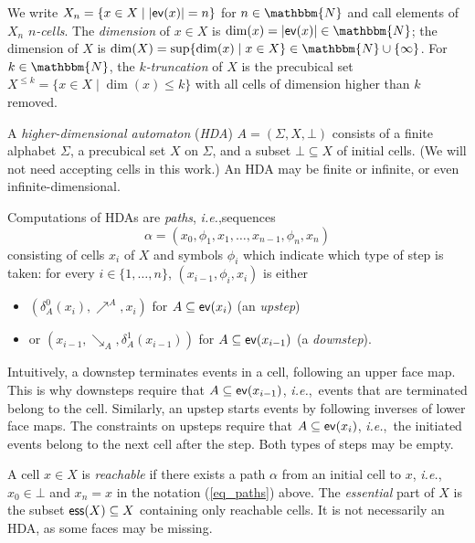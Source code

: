 \documentclass[runningheads,envcountsame]{llncs}
\newcommand*\ie{\textit{i.e.},}
\newcommand*\ev{\textup{\textsf{ev}}}
\newcommand*\Nat{\mathbbm{N}}
\newcommand*\arrO[1]{\mathrel{\nearrow^{#1}}}
\newcommand*\arrI[1]{\mathrel{\searrow_{#1}}}
\newcommand*\ess{\textup{\textsf{ess}}}
\begin{document}
We write $X_n=\{x\in X\mid |\ev(x)|=n\}$ for $n\in \Nat$ and call elements of $X_n$ \emph{$n$-cells}.
The \emph{dimension} of $x\in X$ is $\dim(x)=|\ev(x)|\in \Nat$;
the dimension of $X$ is $\dim(X)=\sup\{\dim(x)\mid x\in X\}\in \Nat\cup\{\infty\}$.
For $k\in \Nat$, the \emph{$k$-truncation} of $X$
is the precubical set $X^{\le k}=\{x\in X\mid \dim(x)\le k\}$
with all cells of dimension higher than $k$ removed.

A \emph{higher-dimensional automaton} (\emph{HDA})
$A=(\Sigma, X, \bot)$ consists of
a finite alphabet $\Sigma$,
a precubical set $X$ on $\Sigma$,
and a subset $\bot\subseteq X$ of initial cells.
(We will not need accepting cells in this work.)
An HDA may be finite or infinite, or even infinite-dimensional.

Computations of HDAs are \emph{paths}, \ie sequences
\begin{equation}
\label{eq_paths}
  \alpha=(x_0, \phi_1, x_1, \dotsc, x_{n-1}, \phi_n, x_n)
\end{equation}
consisting of cells $x_i$ of $X$ and symbols $\phi_i$ which indicate which type of step is taken:
for every $i\in\{1,\dotsc, n\}$, $(x_{i-1}, \phi_i, x_i)$ is either
\begin{itemize}
\item $(\delta^0_A(x_i), \arrO{A}, x_i)$ for $A\subseteq \ev(x_i)$ (an \emph{upstep})
\item or $(x_{i-1}, \arrI{A}, \delta^1_A(x_{i-1}))$ for $A\subseteq \ev(x_{i-1})$ (a \emph{downstep}).
\end{itemize}

Intuitively, a downstep terminates events in a cell, following an upper face map.
This is why downsteps require that $A\subseteq \ev(x_{i-1})$, \ie~events that are terminated belong to the cell. Similarly, 
an upstep starts events by following inverses of lower face maps.
The constraints on upsteps require that $A\subseteq \ev(x_i)$, \ie~the initiated events belong to the next cell after the step.
Both types of steps may be empty.

A cell $x\in X$ is \emph{reachable} if there exists a path $\alpha$ from an initial cell to $x$,
\ie $x_0\in \bot$ and $x_n=x$ in the notation (\ref{eq_paths}) above.
The \emph{essential} part of $X$ is the subset $\ess(X)\subseteq X$ containing only reachable cells.
It is not necessarily an HDA, as some faces may be missing.
\end{document}

